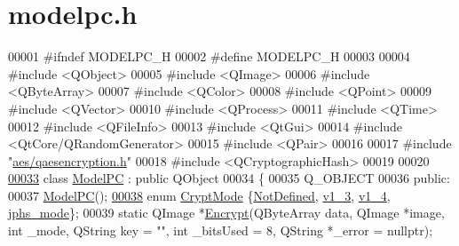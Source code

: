 \hypertarget{modelpc_8h_source}{}\section{modelpc.\+h}
\label{modelpc_8h_source}

\begin{DoxyCode}
00001 \textcolor{preprocessor}{#ifndef MODELPC\_H}
00002 \textcolor{preprocessor}{#define MODELPC\_H}
00003 
00004 \textcolor{preprocessor}{#include <QObject>}
00005 \textcolor{preprocessor}{#include <QImage>}
00006 \textcolor{preprocessor}{#include <QByteArray>}
00007 \textcolor{preprocessor}{#include <QColor>}
00008 \textcolor{preprocessor}{#include <QPoint>}
00009 \textcolor{preprocessor}{#include <QVector>}
00010 \textcolor{preprocessor}{#include <QProcess>}
00011 \textcolor{preprocessor}{#include <QTime>}
00012 \textcolor{preprocessor}{#include <QFileInfo>}
00013 \textcolor{preprocessor}{#include <QtGui>}
00014 \textcolor{preprocessor}{#include <QtCore/QRandomGenerator>}
00015 \textcolor{preprocessor}{#include <QPair>}
00016 
00017 \textcolor{preprocessor}{#include "\hyperlink{qaesencryption_8h}{aes/qaesencryption.h}"}
00018 \textcolor{preprocessor}{#include <QCryptographicHash>}
00019 
00020 
\hypertarget{modelpc_8h_source.tex_l00033}{}\hyperlink{class_model_p_c}{00033} \textcolor{keyword}{class }\hyperlink{class_model_p_c}{ModelPC} : \textcolor{keyword}{public} QObject
00034 \{
00035     Q\_OBJECT
00036 \textcolor{keyword}{public}:
00037     \hyperlink{class_model_p_c_ae12ebe65ec973c02a0de4850a7c1e31c}{ModelPC}();
\hypertarget{modelpc_8h_source.tex_l00038}{}\hyperlink{class_model_p_c_a296dd7afe3e1c49b3da25fd644fe4ceba43138df6b33a6b2bf608768907f95abc}{00038}     \textcolor{keyword}{enum} \hyperlink{class_model_p_c_a296dd7afe3e1c49b3da25fd644fe4ceb}{CryptMode} \{\hyperlink{class_model_p_c_a296dd7afe3e1c49b3da25fd644fe4ceba287198790ac9799acd03c99d63a6faea}{NotDefined}, \hyperlink{class_model_p_c_a296dd7afe3e1c49b3da25fd644fe4ceba7612e38de7178170655a56ddcf96e12c}{v1\_3}, \hyperlink{class_model_p_c_a296dd7afe3e1c49b3da25fd644fe4ceba43138df6b33a6b2bf608768907f95abc}{v1\_4}, \hyperlink{class_model_p_c_a296dd7afe3e1c49b3da25fd644fe4ceba90ca32d3ccbb6be224cdfc33f7096eea}{jphs\_mode}\};
00039     \textcolor{keyword}{static} QImage *\hyperlink{class_model_p_c_a271cf9285e32df58ffbfc918e6482bbd}{Encrypt}(QByteArray data, QImage *image, \textcolor{keywordtype}{int} \_mode, QString key = \textcolor{stringliteral}{""}, \textcolor{keywordtype}{int} 
      \_bitsUsed = 8, QString *\_error = \textcolor{keyword}{nullptr});

\end{DoxyCode}
